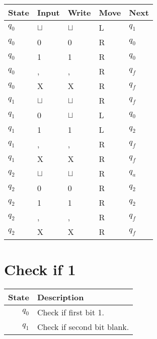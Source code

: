 \documentclass[a4paper, hidelinks, twocolumn, 9pt]{article}
\newcommand{\blm}{\sqcup}
\newcommand{\bl}{\(\blm\)}
\begin{document}
  \begin{center}
    \begin{tabular}{x{1cm}x{1cm}x{1cm}x{1cm}x{1cm}}
      \toprule
      State & Input & Write & Move & Next \\
      \midrule
      \(q_0\) & \bl & \bl & L & \(q_1\) \\
      \(q_0\) &   0 &   0 & R & \(q_0\) \\
      \(q_0\) &   1 &   1 & R & \(q_0\) \\
      \(q_0\) &   , &   , & R & \(q_f\) \\
      \(q_0\) &   X &   X & R & \(q_f\) \\
      \midrule
      \(q_1\) & \bl & \bl & R & \(q_f\) \\
      \(q_1\) &   0 & \bl & L & \(q_0\) \\
      \(q_1\) &   1 &   1 & L & \(q_2\) \\
      \(q_1\) &   , &   , & R & \(q_f\) \\
      \(q_1\) &   X &   X & R & \(q_f\) \\
      \midrule
      \(q_2\) & \bl & \bl & R & \(q_a\) \\
      \(q_2\) &   0 &   0 & R & \(q_2\) \\
      \(q_2\) &   1 &   1 & R & \(q_2\) \\
      \(q_2\) &   , &   , & R & \(q_f\) \\
      \(q_2\) &   X &   X & R & \(q_f\) \\
      \bottomrule
    \end{tabular}
  \end{center}

  \section*{Check if 1}

  \begin{tabular}{rl}
    \textbf{State} & \textbf{Description} \\
    \midrule
    \( q_0 \) & Check if first bit 1. \\
    \( q_1 \) & Check if second bit blank. \\
  \end{tabular}
\end{document}
